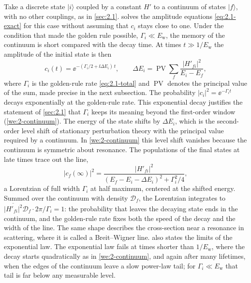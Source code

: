 Take a discrete state $|i\rangle$ coupled by a constant $H'$ to a continuum of states $|f\rangle$, with no other couplings, as in \cref{sec:2.1}.  solves the amplitude equations \cref{eq:2.1-exact} for this case without assuming that $c_i$ stays close to one. Under the condition that made the golden rule possible, $\varGamma_i \ll E_{\mathrm{w}}$, the memory of the continuum is short compared with the decay time. At times $t \gg 1/E_{\mathrm{w}}$ the amplitude of the initial state is then
\begin{equation}
  c_i(t) = \ee^{-(\varGamma_i/2 + \ii\Delta E_i)\,t}, \qquad
  \Delta E_i = \operatorname{PV}\sum_f\frac{|H'_{fi}|^2}{E_i - E_f} ,
  \label{eq:2.4-WW}
\end{equation}
where $\varGamma_i$ is the golden-rule rate \cref{eq:2.1-total} and $\operatorname{PV}$ denotes the principal value of the sum, made precise in the next subsection. The probability $|c_i|^2 = \ee^{-\varGamma_it}$ decays exponentially at the golden-rule rate. This exponential decay justifies the statement of \cref{sec:2.1} that $\varGamma_i$ keeps its meaning beyond the first-order window (\cref{we:2-continuum}). The energy of the state shifts by $\Delta E_i$, which is the second-order level shift of stationary perturbation theory with the principal value required by a continuum. In \cref{we:2-continuum} this level shift vanishes because the continuum is symmetric about resonance. The populations of the final states at late times trace out the line,
\begin{equation}
  |c_f(\infty)|^2 = \frac{|H'_{fi}|^2}{(E_f - E_i - \Delta E_i)^2 + \varGamma_i^2/4} ,
  \label{eq:2.4-lorentz}
\end{equation}
a Lorentzian of full width $\varGamma_i$ at half maximum, centered at the shifted energy. Summed over the continuum with density $\mathcal{D}_f$, the Lorentzian integrates to $\overline{|H'_{fi}|^2}\mathcal{D}_f\cdot 2\pi/\varGamma_i = 1$: the probability that leaves the decaying state ends in the continuum, and the golden-rule rate fixes both the speed of the decay and the width of the line. The same shape describes the cross-section near a resonance in scattering, where it is called a Breit--Wigner line.  also states the limits of the exponential law. The exponential law fails at times shorter than $1/E_{\mathrm{w}}$, where the decay starts quadratically as in \cref{we:2-continuum}, and again after many lifetimes, when the edges of the continuum leave a slow power-law tail; for $\varGamma_i \ll E_{\mathrm{w}}$ that tail is far below any measurable level.

